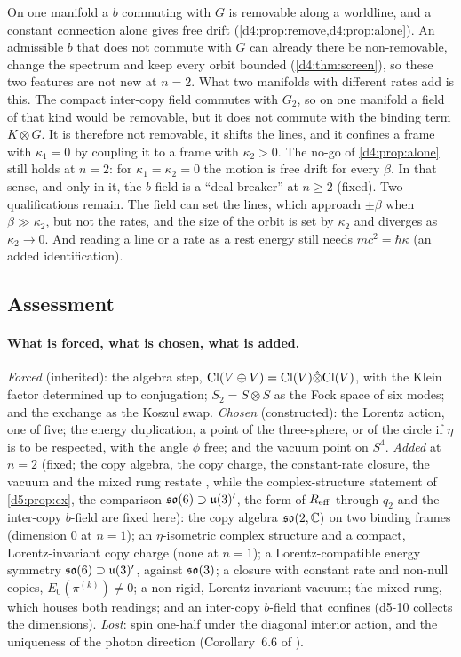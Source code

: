 \begin{remark}
\label{d5:rem:dealbreaker}
On one manifold a $b$ commuting with $G$ is removable along a worldline, and a constant connection alone gives free drift
(\cref{d4:prop:remove,d4:prop:alone}). An admissible $b$ that does not commute with $G$ can already there be non-removable, change the spectrum
and keep every orbit bounded (\cref{d4:thm:screen}), so these two features are not new at $n=2$. What two manifolds with different rates add is
this. The compact inter-copy field commutes with $G_2$, so on one manifold a field of that kind would be removable, but it does not commute with
the binding term $K\otimes G$. It is therefore not removable, it shifts the lines, and it confines a frame with $\kappa_1=0$ by coupling it to a
frame with $\kappa_2>0$. The no-go of \cref{d4:prop:alone} still holds at $n=2$: for $\kappa_1=\kappa_2=0$ the motion is free drift for every
$\beta$. In that sense, and only in it, the $b$-field is a ``deal breaker'' at $n\ge2$ (fixed). Two qualifications remain. The field can set the lines, which approach $\pm\beta$ when $\beta\gg\kappa_2$, but not the rates, and the size of
the orbit is set by $\kappa_2$ and diverges as $\kappa_2\to0$. And reading a line or a rate as a rest energy still needs $mc^2=\hbar\kappa$ (an added
identification).
\end{remark}

\subsection{Assessment}
\label{d5:sec:assess}

\paragraph{What is forced, what is chosen, what is added.} \emph{Forced} (inherited): the algebra step, $\mathrm{Cl}(V\oplus V)=\mathrm{Cl}(V)\hat\otimes\mathrm{Cl}(V)$, with the
Klein factor determined up to conjugation; $S_2=S\otimes S$ as the Fock space of six modes; and the exchange as the Koszul swap.
\emph{Chosen} (constructed): the Lorentz action, one of five; the energy duplication, a point of the three-sphere, or of the circle if $\eta$ is
to be respected, with the angle $\phi$ free; and the vacuum point on $S^4$. \emph{Added} at $n=2$ (fixed; the copy algebra, the copy charge, the constant-rate closure, the vacuum and the mixed rung restate \cite{ES17}, while the complex-structure statement of \cref{d5:prop:cx}, the comparison $\mathfrak{so}(6)\supset\mathfrak{u}(3)'$, the form of $R_{\rm eff}$ through $q_2$ and the inter-copy $b$-field are fixed here): the copy algebra $\mathfrak{so}(2,\mathbb{C})$ on two
binding frames (dimension $0$ at $n=1$); an $\eta$-isometric complex structure and a compact, Lorentz-invariant copy charge (none at $n=1$); a
Lorentz-compatible energy symmetry $\mathfrak{so}(6)\supset\mathfrak{u}(3)'$, against $\mathfrak{so}(3)$; a closure with constant rate and non-null copies, $E_0(\pi^{(k)})\neq0$; a non-rigid,
Lorentz-invariant vacuum; the mixed rung, which houses both readings; and an inter-copy $b$-field that confines (d5-10 collects the
dimensions). \emph{Lost}: spin one-half under the diagonal interior action, and the uniqueness of the photon direction (Corollary~6.6 of
\cite{ES17}).

